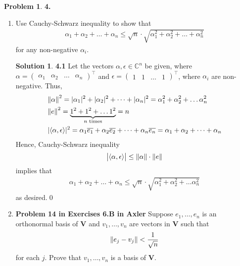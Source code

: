 \documentclass{article}
\theoremstyle{definition}
\newtheorem*{prob*}{Problem}
\newtheorem*{sln*}{Solution}
\newcommand{\V}{\mathbf{V}}
\newcommand{\la}{\langle}
\newcommand{\ra}{\rangle}
\begin{document}
\newpage





\begin{prob*}\textbf{4.}
	\begin{enumerate}
		\item Use Cauchy-Schwarz inequality to show that 
		\begin{align*}
		\alpha_1 + \alpha_2 + \dots + \alpha_n \leq 
		\sqrt{n}\cdot \sqrt{\alpha_1^2+ \alpha_2^2 + \dots + \alpha_n^2}
		\end{align*}
		for any non-negative $\alpha_i$.
		
		\begin{sln*}\textbf{4.1}
			Let the vectors $\alpha, \epsilon \in \mathbb{C}^n $ be given, where $\alpha = \begin{pmatrix}
			\alpha_1 & \alpha_2 & \dots & \alpha_n
			\end{pmatrix}^\top$ and $\epsilon = \begin{pmatrix}
			1 & 1 & \dots & 1
			\end{pmatrix}^\top$, where $\alpha_i$ are non-negative. Thus,
			\begin{align*}
			&\norm{\alpha}^2 = \vert \alpha_1 \vert^2 + \vert \alpha_2 \vert^2 + \dots + \vert \alpha_n \vert^2 = \alpha_1^2 + \alpha_2^2 + \dots \alpha_n^2\\
			&\norm{e}^2  = \underbrace{1^2 + 1^2 + \dots 1^2}_{n \text{ times}} = n\\
			&\vert \la \alpha,\epsilon\ra\vert^2 = \alpha_1 \overline{e_1} +  \alpha_2 \overline{e_2} +  \dots + \alpha_n \overline{e_n} = \alpha_1 + \alpha_2 + \dots + \alpha_n 
			\end{align*} Hence, Cauchy-Schwarz inequality
			\begin{align*}
			\big\vert \la \alpha , \epsilon \ra \big\vert \leq \norm{\alpha}\cdot \norm{e}
			\end{align*}
			implies that 
			\begin{align*}
			\alpha_1 + \alpha_2 + \dots + \alpha_n  \leq \sqrt{n}\cdot \sqrt{\alpha_1^2 + \alpha_2^2 + \dots \alpha_n^2}
			\end{align*}
			as desired.\qed
		\end{sln*}
	
	
		\newpage
		
		
		
		\item \textbf{Problem 14 in Exercises 6.B in Axler} Suppose $e_1,\dots,e_n$ is an orthonormal basis of $\V$ and $v_1,\dots,v_n$ are vectors in $\V$ such that
		\begin{align*}
		\norm{e_j - v_j } < \frac{1}{\sqrt{n}}
		\end{align*}
		for each $j$. Prove that $v_1,\dots,v_n$ is a basis of $\V$.
		

\end{enumerate}
\end{prob*}
\end{document}
